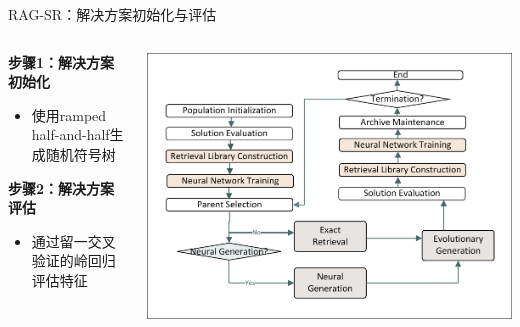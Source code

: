 \documentclass[aspectratio=1610]{beamer}
\begin{document}
    \begin{frame}{RAG-SR：解决方案初始化与评估}
        \begin{columns}
            \begin{column}{0.5\textwidth}
                \textbf{步骤1：解决方案初始化}
                \begin{itemize}
                    \item 使用ramped half-and-half生成随机符号树
                \end{itemize}

                \vspace{0.3cm}
                \textbf{步骤2：解决方案评估}
                \begin{itemize}
                    \item 通过留一交叉验证的岭回归评估特征
                \end{itemize}
            \end{column}
            \begin{column}{0.5\textwidth}
                \includegraphics[width=1.0\textwidth]{figs/Workflow.pdf}
            \end{column}
        \end{columns}
    \end{frame}
\end{document}
